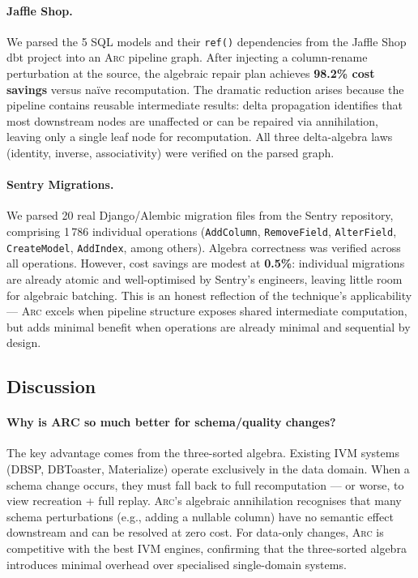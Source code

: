 \documentclass[sigplan,screen,nonacm]{acmart}
\newcommand{\arc}{\textsc{Arc}\xspace}
\begin{document}
\paragraph{Jaffle Shop.}
We parsed the 5 SQL models and their \texttt{ref()} dependencies from
the Jaffle Shop dbt project into an \arc pipeline graph.  After
injecting a column-rename perturbation at the source, the algebraic
repair plan achieves \textbf{98.2\% cost savings} versus na\"{i}ve
recomputation.  The dramatic reduction arises because the pipeline
contains reusable intermediate results: delta propagation identifies
that most downstream nodes are unaffected or can be repaired via
annihilation, leaving only a single leaf node for recomputation.  All
three delta-algebra laws (identity, inverse, associativity) were
verified on the parsed graph.

\paragraph{Sentry Migrations.}
We parsed 20 real Django/Alembic migration files from the Sentry
repository, comprising 1\,786 individual operations
(\texttt{AddColumn}, \texttt{RemoveField}, \texttt{AlterField},
\texttt{CreateModel}, \texttt{AddIndex}, among others).  Algebra
correctness was verified across all operations.  However, cost savings
are modest at \textbf{0.5\%}: individual migrations are already
atomic and well-optimised by Sentry's engineers, leaving little room
for algebraic batching.  This is an honest reflection of the
technique's applicability --- \arc excels when pipeline structure
exposes shared intermediate computation, but adds minimal benefit when
operations are already minimal and sequential by design.

\subsection{Discussion}

\paragraph{Why is ARC so much better for schema/quality changes?}
The key advantage comes from the three-sorted algebra.  Existing IVM
systems (DBSP, DBToaster, Materialize) operate exclusively in the data
domain.  When a schema change occurs, they must fall back to full
recomputation --- or worse, to view recreation + full replay.  \arc's
algebraic annihilation recognises that many schema perturbations (e.g., adding a
nullable column) have no semantic effect downstream and can be resolved
at zero cost.  For data-only changes, \arc is competitive with the best
IVM engines, confirming that the three-sorted algebra introduces
minimal overhead over specialised single-domain systems.
\end{document}
